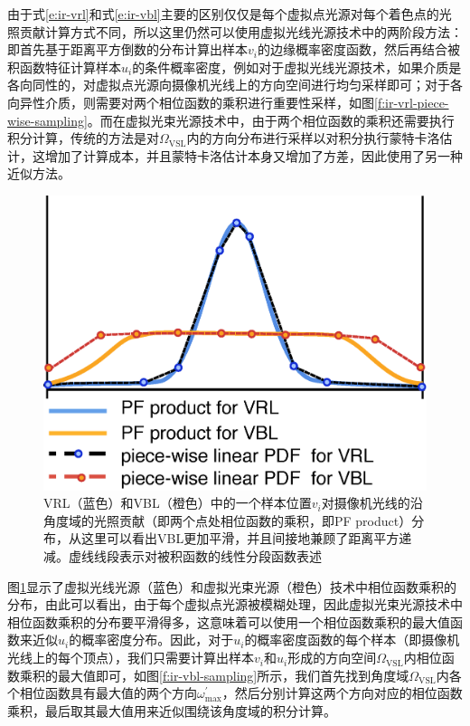 由于式\ref{e:ir-vrl}和式\ref{e:ir-vbl}主要的区别仅仅是每个虚拟点光源对每个着色点的光照贡献计算方式不同，所以这里仍然可以使用虚拟光线光源技术中的两阶段方法：即首先基于距离平方倒数的分布计算出样本$v_i$的边缘概率密度函数，然后再结合被积函数特征计算样本$u_i$的条件概率密度，例如对于虚拟光线光源技术，如果介质是各向同性的，对虚拟点光源向摄像机光线上的方向空间进行均匀采样即可；对于各向异性介质，则需要对两个相位函数的乘积进行重要性采样，如图\ref{f:ir-vrl-piece-wise-sampling}。而在虚拟光束光源技术中，由于两个相位函数的乘积还需要执行积分计算，传统的方法是对$\Omega_{\text{VSL}}$内的方向分布进行采样以对积分执行蒙特卡洛估计，这增加了计算成本，并且蒙特卡洛估计本身又增加了方差，因此\cite{a:ProgressiveVirtualBeamLights}使用了另一种近似方法。

\begin{figure}
	\sidecaption
	\includegraphics[width=.5\textwidth]{figures/ir/vbl-piece-wise-sampling}
	\caption{VRL（蓝色）和VBL（橙色）中的一个样本位置$v_i$对摄像机光线的沿角度域的光照贡献（即两个点处相位函数的乘积，即PF product）分布，从这里可以看出VBL更加平滑，并且间接地兼顾了距离平方递减。虚线线段表示对被积函数的线性分段函数表述}
	\label{f:ir-vbl-piece-wise-sampling}
\end{figure}

图\ref{f:ir-vbl-piece-wise-sampling}显示了虚拟光线光源（蓝色）和虚拟光束光源（橙色）技术中相位函数乘积的分布，由此可以看出，由于每个虚拟点光源被模糊处理，因此虚拟光束光源技术中相位函数乘积的分布要平滑得多，这意味着可以使用一个相位函数乘积的最大值函数来近似$u_i$的概率密度分布。因此，对于$u_i$的概率密度函数的每个样本（即摄像机光线上的每个顶点），我们只需要计算出样本$v_i$和$u_i$形成的方向空间$\Omega_{\text{VSL}}$内相位函数乘积的最大值即可，如图\ref{f:ir-vbl-sampling}所示，我们首先找到角度域$\Omega_{\text{VSL}}$内各个相位函数具有最大值的两个方向$\omega^{'}_{\max}$，然后分别计算这两个方向对应的相位函数乘积，最后取其最大值用来近似围绕该角度域的积分计算。

